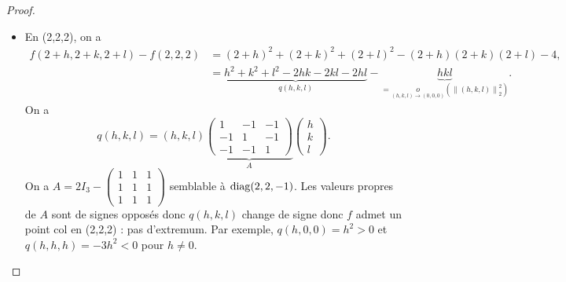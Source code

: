 \documentclass[12pt]{article}
\begin{document}
\begin{proof}
\begin{itemize}
		\item En (2,2,2), on a 
		\begin{align}
			f(2+h,2+k,2+l)-f(2,2,2)
			&=(2+h)^{2}+(2+k)^{2}+(2+l)^{2}-(2+h)(2+k)(2+l)-4,\\
			&=\underbrace{h^{2}+k^{2}+l^{2}-2hk-2kl-2hl}_{q(h,k,l)}-\underbrace{hkl}_{=\underset{(h,k,l)\to(0,0,0)}{o}(\left\lVert (h,k,l)\right\rVert_{2}^{2})}.
		\end{align}
		On a 
		\begin{equation}
			q(h,k,l)=(h,k,l)\underbrace{\begin{pmatrix}
				1&-1&-1\\-1&1&-1\\-1&-1&1
			\end{pmatrix}}_{A}\begin{pmatrix}
				h\\k\\l
			\end{pmatrix}.
		\end{equation}
		On a $A=2I_{3}-\begin{pmatrix}
			1&1&1\\1&1&1\\1&1&1
		\end{pmatrix}$ semblable à $\operatorname{diag}(2,2,-1)$. Les valeurs propres de $A$ sont de signes opposés donc $q(h,k,l)$ change de signe donc $f$ admet un point col en (2,2,2) : pas d'extremum. Par exemple, $q(h,0,0)=h^{2}>0$ et $q(h,h,h)=-3h^{2}<0$ pour $h\neq0$.
	\end{itemize}
\end{proof}
\end{document}
